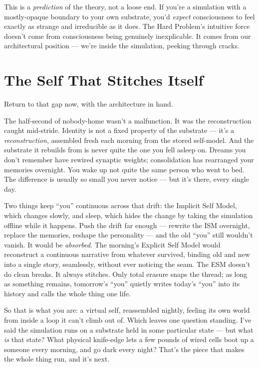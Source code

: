 \documentclass[11pt, twoside, openright]{book}
\begin{document}
This is a \textit{prediction} of the theory, not a loose end. If you're a simulation with a mostly-opaque boundary to your own substrate, you'd \textit{expect} consciousness to feel exactly as strange and irreducible as it does. The Hard Problem's intuitive force doesn't come from consciousness being genuinely inexplicable. It comes from our architectural position --- we're inside the simulation, peeking through cracks.

\section*{The Self That Stitches Itself}

Return to that gap now, with the architecture in hand.

The half-second of nobody-home wasn't a malfunction. It was the reconstruction caught mid-stride. Identity is not a fixed property of the substrate --- it's a \textit{reconstruction}, assembled fresh each morning from the stored self-model. And the substrate it rebuilds from is never quite the one you fell asleep on. Dreams you don't remember have rewired synaptic weights; consolidation has rearranged your memories overnight. You wake up not quite the same person who went to bed. The difference is usually so small you never notice --- but it's there, every single day.

Two things keep ``you'' continuous across that drift: the Implicit Self Model, which changes slowly, and sleep, which hides the change by taking the simulation offline while it happens. Push the drift far enough --- rewrite the ISM overnight, replace the memories, reshape the personality --- and the old ``you'' still wouldn't vanish. It would be \textit{absorbed}. The morning's Explicit Self Model would reconstruct a continuous narrative from whatever survived, binding old and new into a single story, seamlessly, without ever noticing the seam. The ESM doesn't do clean breaks. It always stitches. Only total erasure snaps the thread; as long as something remains, tomorrow's ``you'' quietly writes today's ``you'' into its history and calls the whole thing one life.

So that is what you are: a virtual self, reassembled nightly, feeling its own world from inside a loop it can't climb out of. Which leaves one question standing. I've said the simulation runs on a substrate held in some particular state --- but what \textit{is} that state? What physical knife-edge lets a few pounds of wired cells boot up a someone every morning, and go dark every night? That's the piece that makes the whole thing run, and it's next.
\end{document}
